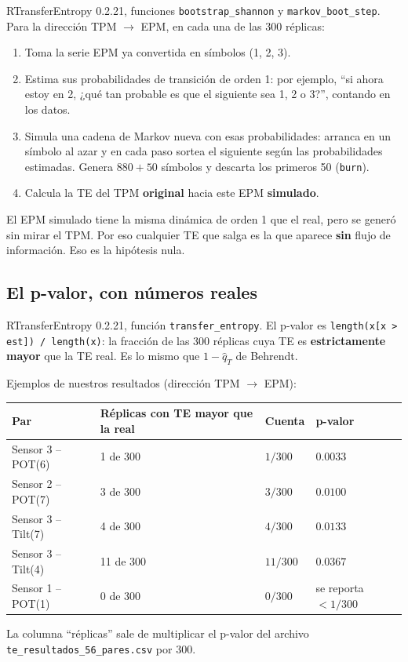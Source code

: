 \documentclass[11pt,openany]{book}
\newcommand{\archivo}[1]{\texttt{\small #1}}
\begin{document}
\begin{codigo}{RTransferEntropy 0.2.21, funciones \texttt{bootstrap\_shannon} y \texttt{markov\_boot\_step}.}
Para la dirección TPM $\to$ EPM, en cada una de las 300 réplicas:
\begin{enumerate}
\item Toma la serie EPM ya convertida en símbolos (1, 2, 3).
\item Estima sus probabilidades de transición de orden 1: por ejemplo, ``si ahora estoy en 2, ¿qué tan probable es que el siguiente sea 1, 2 o 3?'', contando en los datos.
\item Simula una cadena de Markov nueva con esas probabilidades: arranca en un símbolo al azar y en cada paso sortea el siguiente según las probabilidades estimadas. Genera $880 + 50$ símbolos y descarta los primeros 50 (\texttt{burn}).
\item Calcula la TE del TPM \textbf{original} hacia este EPM \textbf{simulado}.
\end{enumerate}
El EPM simulado tiene la misma dinámica de orden 1 que el real, pero se generó sin mirar el TPM. Por eso cualquier TE que salga es la que aparece \textbf{sin} flujo de información. Eso es la hipótesis nula.
\end{codigo}

\subsection*{El p-valor, con números reales}

\begin{codigo}{RTransferEntropy 0.2.21, función \texttt{transfer\_entropy}.}
El p-valor es \texttt{length(x[x > est]) / length(x)}: la fracción de las 300 réplicas cuya TE es \textbf{estrictamente mayor} que la TE real. Es lo mismo que $1-\hat q_T$ de Behrendt.
\end{codigo}

Ejemplos de nuestros resultados (dirección TPM $\to$ EPM):
\begin{center}\small
\begin{tabular}{llll}
\toprule
Par & Réplicas con TE mayor que la real & Cuenta & p-valor \\
\midrule
Sensor 3 -- POT(6) & 1 de 300 & $1/300$ & $0.0033$ \\
Sensor 2 -- POT(7) & 3 de 300 & $3/300$ & $0.0100$ \\
Sensor 3 -- Tilt(7) & 4 de 300 & $4/300$ & $0.0133$ \\
Sensor 3 -- Tilt(4) & 11 de 300 & $11/300$ & $0.0367$ \\
Sensor 1 -- POT(1) & 0 de 300 & $0/300$ & se reporta $<1/300$ \\
\bottomrule
\end{tabular}
\end{center}
La columna ``réplicas'' sale de multiplicar el p-valor del archivo \archivo{te\_resultados\_56\_pares.csv} por 300.
\end{document}

